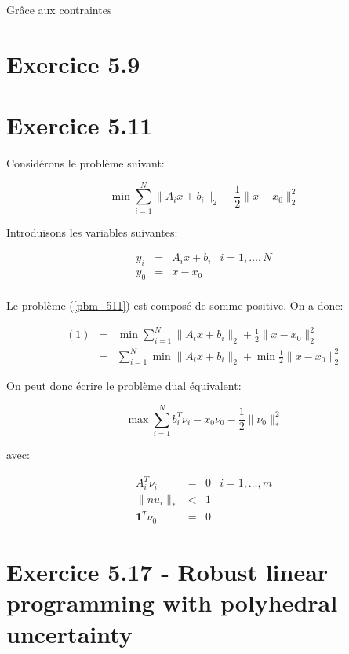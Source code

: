 \documentclass{article}
\begin{document}
Grâce aux contraintes


\section{Exercice 5.9}

\section{Exercice 5.11}

Considérons le problème suivant:

\begin{equation}
\label{pbm_511}
\min \sum_{i = 1}^N \| A_i x + b_i \|_2 + \frac{1}{2} \| x - x_0 \|_2^2
\end{equation}

Introduisons les variables suivantes:

\begin{align*}
y_i & = & A_i x + b_i & i = 1, \dots, N \\
y_0 & = & x - x_0 & \\
\end{align*}

Le problème (\ref{pbm_511}) est composé de somme positive. On a donc:

\begin{align*}
(1) & = & \min \sum_{i = 1}^N \| A_i x + b_i \|_2 + \frac{1}{2} \| x - x_0
\|_2^2\\
    & = & \sum_{i = 1}^ N \min \| A_i x + b_i \|_2 + \min \frac {1}{2} \| x -
    x_0  \|_2^2
\end{align*}

On peut donc écrire le problème dual équivalent:

\begin{equation*}
\max \sum_{i = 1}^N b_i^T \nu_i - x_0 \nu_0 - \frac{1}{2} \| \nu_0\|_*^2
\end{equation*}

avec:

\begin{align*}
A_i^T \nu_i & = & 0 & i=1, \dots, m \\
\| nu_i \|_* & < & 1 & \\
\mathbf{1}^T \nu_0 & = & 0 &
\end{align*}

\section{Exercice 5.17 - Robust linear programming with polyhedral uncertainty}
\end{document}

